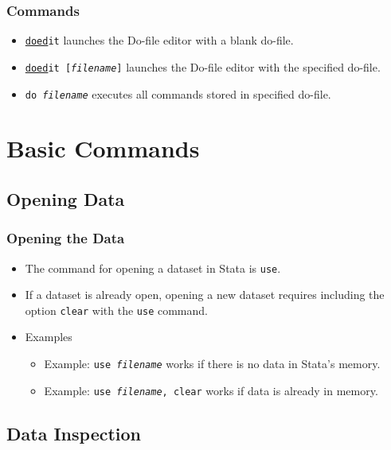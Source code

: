 \documentclass{beamer}
\begin{document}
\begin{frame}
	\frametitle{Commands}
	\begin{itemize}
		\item \texttt{\underline{doed}it} launches the Do-file editor with a blank do-file.
		\item \texttt{\underline{doed}it [\textit{filename}]} launches the Do-file editor with the specified do-file.
		\item \texttt{do \textit{filename}} executes all commands stored in specified do-file. 
	\end{itemize}
\end{frame}

\section{Basic Commands}

\subsection{Opening Data}

\begin{frame}
	\frametitle{Opening the Data}
		\begin{itemize}
			\item The command for opening a dataset in Stata is \texttt{use}.
			\item If a dataset is already open, opening a new dataset requires including the option \texttt{clear} with the \texttt{use} command.
			\item Examples
				\begin{itemize}
					\item Example: \texttt{use \textit{filename}} works if there is no data in Stata's memory.
					\item Example: \texttt{use \textit{filename}, clear} works if data is already in memory.
				\end{itemize}
		\end{itemize}
\end{frame}

\subsection{Data Inspection}
\end{document}
